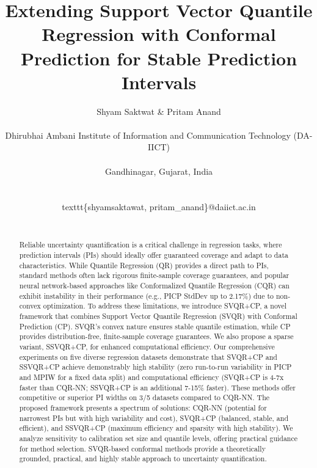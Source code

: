 \documentclass{article}
\title{Extending Support Vector Quantile Regression with Conformal Prediction for Stable Prediction Intervals}
\author{
  Shyam Saktwat \& Pritam Anand \\\\
  Dhirubhai Ambani Institute of Information and Communication Technology (DA-IICT) \\\\
  Gandhinagar, Gujarat, India \\\\
  \\texttt{\{shyamsaktawat, pritam\_anand\}@daiict.ac.in} \\\\
}
\begin{document}
\maketitle

\begin{abstract}
Reliable uncertainty quantification is a critical challenge in regression tasks, where prediction intervals (PIs) should ideally offer guaranteed coverage and adapt to data characteristics. While Quantile Regression (QR) provides a direct path to PIs, standard methods often lack rigorous finite-sample coverage guarantees, and popular neural network-based approaches like Conformalized Quantile Regression (CQR) can exhibit instability in their performance (e.g., PICP StdDev up to 2.17\%) due to non-convex optimization. To address these limitations, we introduce SVQR+CP, a novel framework that combines Support Vector Quantile Regression (SVQR) with Conformal Prediction (CP). SVQR's convex nature ensures stable quantile estimation, while CP provides distribution-free, finite-sample coverage guarantees. We also propose a sparse variant, SSVQR+CP, for enhanced computational efficiency.
Our comprehensive experiments on five diverse regression datasets demonstrate that SVQR+CP and SSVQR+CP achieve demonstrably high stability (zero run-to-run variability in PICP and MPIW for a fixed data split) and computational efficiency (SVQR+CP is 4-7x faster than CQR-NN; SSVQR+CP is an additional 7-15\% faster). These methods offer competitive or superior PI widths on 3/5 datasets compared to CQR-NN. The proposed framework presents a spectrum of solutions: CQR-NN (potential for narrowest PIs but with high variability and cost), SVQR+CP (balanced, stable, and efficient), and SSVQR+CP (maximum efficiency and sparsity with high stability). We analyze sensitivity to calibration set size and quantile levels, offering practical guidance for method selection. SVQR-based conformal methods provide a theoretically grounded, practical, and highly stable approach to uncertainty quantification.
\end{abstract}
\end{document}
